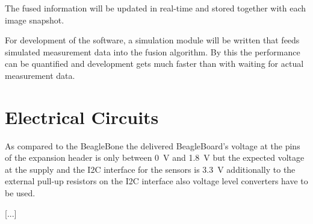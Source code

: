 The fused information will be updated in real-time and stored together with each image snapshot.

For development of the software, a simulation module will be written that feeds simulated measurement data into the fusion algorithm.
By this the performance can be quantified and development gets much faster than with waiting for actual measurement data. 



\FloatBarrier
\section{Electrical Circuits}

As compared to the BeagleBone the delivered BeagleBoard's voltage at the pins
of the expansion header is only between 0~V and 1.8~V but the expected voltage
at the supply and the I2C interface for the sensors is 3.3~V additionally to
the external pull-up resistors on the I2C interface also voltage level
converters have to be used.

[...]